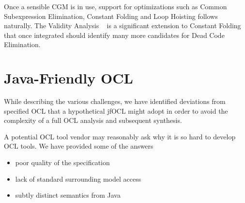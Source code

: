 \documentclass[sigconf]{acmart}
\begin{document}
Once a sensible CGM is in use, support for optimizations such as Common Subexpression Elimination, Constant Folding and Loop Hoisting follows naturally. The Validity Analysis ~\cite{Willink2021} is a significant extension to Constant Folding that once integrated should identify many more candidates for Dead Code Elimination.

\section{Java-Friendly OCL}\label{Java-Friendly OCL}

While describing the various challenges, we have identified deviations from specified OCL that a hypothetical jfOCL might adopt in order to avoid the complexity of a full OCL analysis and subsequent synthesis.

A potential OCL tool vendor may reasonably ask why it is so hard to develop OCL tools. We have provided some of the answers

\begin{itemize}
	\item poor quality of the specification
	\item lack of standard surrounding model access
	\item subtly distinct semantics from Java
\end{itemize}
\end{document}

